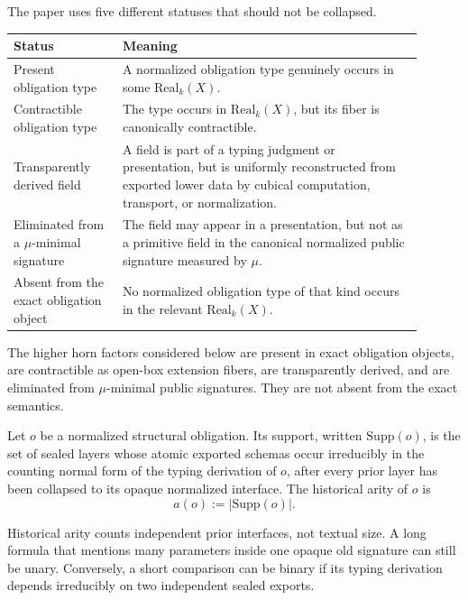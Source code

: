 \documentclass{lmcs}
\begin{document}
\begin{rem}
\label{rem:five-statuses}
The paper uses five different statuses that should not be collapsed.
\begin{center}
\small
\begin{tabular}{p{0.24\linewidth}p{0.66\linewidth}}
\hline
Status & Meaning \\
\hline
Present obligation type & A normalized obligation type genuinely occurs in some
\(\mathrm{Real}_k(X)\). \\
Contractible obligation type & The type occurs in \(\mathrm{Real}_k(X)\), but its fiber is
canonically contractible. \\
Transparently derived field & A field is part of a typing judgment or presentation, but is
uniformly reconstructed from exported lower data by cubical computation, transport, or
normalization. \\
Eliminated from a \(\mu\)-minimal signature & The field may appear in a presentation, but
not as a primitive field in the canonical normalized public signature measured by \(\mu\). \\
Absent from the exact obligation object & No normalized obligation type of that kind occurs
in the relevant \(\mathrm{Real}_k(X)\). \\
\hline
\end{tabular}
\end{center}
The higher horn factors considered below are present in exact obligation objects, are
contractible as open-box extension fibers, are transparently derived, and are eliminated from
\(\mu\)-minimal public signatures.  They are not absent from the exact semantics.
\end{rem}

\begin{defi}
\label{def:historical-arity}
Let \(o\) be a normalized structural obligation.  Its support, written \(\mathrm{Supp}(o)\),
is the set of sealed layers whose atomic exported schemas occur irreducibly in the counting
normal form of the typing derivation of \(o\), after every prior layer has been collapsed to
its opaque normalized interface.  The historical arity of \(o\) is
\[
  a(o) := |\mathrm{Supp}(o)|.
\]
\end{defi}

Historical arity counts independent prior interfaces, not textual size.  A long formula that
mentions many parameters inside one opaque old signature can still be unary.  Conversely, a
short comparison can be binary if its typing derivation depends irreducibly on two
independent sealed exports.
\end{document}
